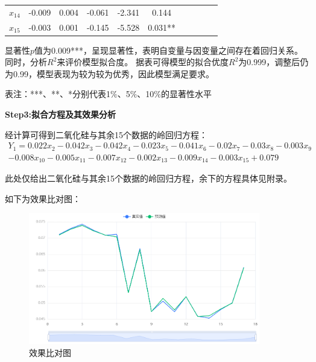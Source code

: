 \documentclass[UTF8]{ctexart}
\begin{document}
\begin{table}[H]
\begin{tabular}{|c|c|c|c|c|c|c|c|c|}
                        $x_{14}$                 & -0.009                             & 0.004                           & -0.061             & -2.341             & 0.144                    & ~                                   & ~                      & ~                                   \\ \cline{1-6}
                        $x_{15}$                 & -0.003                             & 0.001                           & -0.145             & -5.528             & 0.031**                  & ~                                   & ~                      & ~                                   \\ \hline
                    \end{tabular}
                \end{table}

                显著性$p$值为0.009***，呈现显著性，表明自变量与因变量之间存在着回归关系。同时，分析$R^2$来评价模型拟合度。
                据表可得模型的拟合优度$R^2$为0.999，调整后仍为0.99，模型表现为较为较为优秀，因此模型满足要求。

                表注：***、**、*分别代表1$\%$、5$\%$、10$\%$的显著性水平

                \textbf{Step3:拟合方程及其效果分析}

                经计算可得到二氧化硅与其余15个数据的岭回归方程：
                \begin{equation}
                    \begin{split}
                        Y_1	= 0.022x_2-0.042x_3-0.042x_4-0.023x_5-0.041x_6-0.02x_7-0.03x_8-0.003x_9					\\
                        -0.008x_{10}-0.005x_{11}-0.007x_{12}-0.002x_{13}-0.009x_{14}-0.003x_{15}+0.079
                    \end{split}
                \end{equation}

                此处仅给出二氧化硅与其余15个数据的岭回归方程，余下的方程具体见附录。

                如下为效果比对图：
                \begin{figure}[H]\centering
                    \includegraphics[width=0.9\textwidth]{img/效果比对图.png} %
                    \caption{效果比对图} %
                    \label{fig:figure 6} %
                \end{figure}
\end{document}
